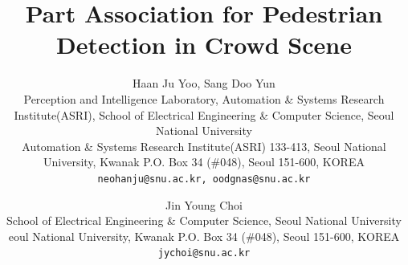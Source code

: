 \documentclass[10pt,twocolumn,letterpaper]{article}
\begin{document}
\title{Part Association for Pedestrian Detection in Crowd Scene}

\author {
   Haan Ju Yoo, Sang Doo Yun\\
   Perception and Intelligence Laboratory, Automation \& Systems Research Institute(ASRI), School of Electrical Engineering \& Computer Science, Seoul National University\\
   Automation \& Systems Research Institute(ASRI) 133-413, Seoul National University, Kwanak P.O. Box 34 (\#048), Seoul 151-600, KOREA\\
   {\tt\small neohanju@snu.ac.kr, oodgnas@snu.ac.kr}
   \and
   Jin Young Choi\\
   School of Electrical Engineering \& Computer Science, Seoul National University\\
   eoul National University, Kwanak P.O. Box 34 (\#048), Seoul 151-600, KOREA\\
   {\tt\small jychoi@snu.ac.kr}
}

\maketitle
\end{document}
